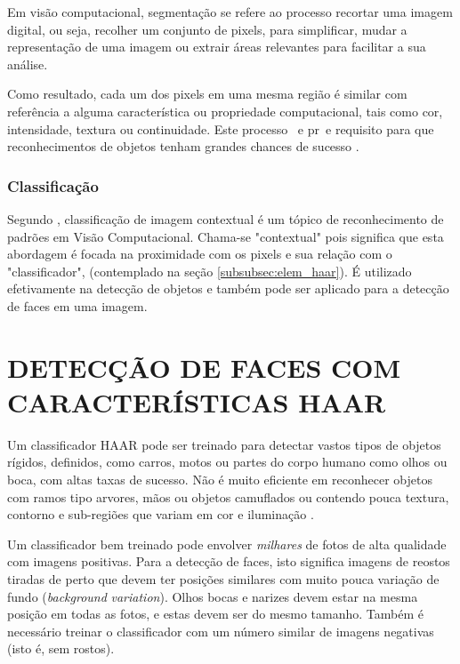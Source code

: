 Em visão computacional, segmentação se refere ao processo recortar uma imagem digital, ou seja, recolher um conjunto de pixels, para simplificar, mudar a representação de uma imagem ou extrair áreas relevantes para facilitar a sua análise. 

Como resultado, cada um dos pixels em uma mesma região é similar com referência a alguma característica ou propriedade computacional, tais como cor, intensidade, textura ou continuidade. Este processo ~e pr~e requisito para que reconhecimentos de objetos tenham grandes chances de sucesso \cite{gonzalez_woods}.

\subsubsection{Classificação}\label{subsubsec:classificacao}

Segundo \cite{edinburgh_classifier}, classificação de imagem contextual é um tópico de reconhecimento de padrões em  Visão Computacional. Chama-se "contextual" pois significa que esta abordagem é focada na proximidade com os pixels e sua relação com o "classificador", (contemplado na seção \autoref{subsubsec:elem_haar}). É utilizado efetivamente na detecção de objetos e também pode ser aplicado para a detecção de faces em uma imagem.




\section{DETECÇÃO DE FACES COM CARACTERÍSTICAS HAAR}\label{sec:deteccao}

Um classificador HAAR pode ser treinado para detectar vastos tipos de objetos rígidos, definidos, como carros, motos ou partes do corpo humano como olhos ou boca, com altas taxas de sucesso. Não é muito eficiente em reconhecer objetos com ramos tipo arvores, mãos ou objetos camuflados ou contendo pouca textura, contorno e sub-regiões que variam em cor e iluminação \cite{drmathew_java_programming}.

Um classificador bem treinado pode envolver \textit{milhares} de fotos de alta qualidade com imagens positivas. Para a detecção de faces, isto significa imagens de reostos tiradas de perto que devem ter posições similares com muito pouca variação de fundo (\textit{background} \textit{variation}). Olhos bocas e narizes devem estar na mesma posição em todas as fotos, e estas devem ser do mesmo tamanho. Também é necessário treinar o classificador com um número similar de imagens negativas (isto é, sem rostos).

